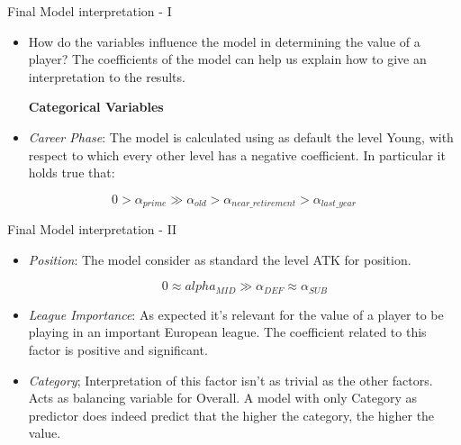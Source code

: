 \documentclass[aspectratio=169,xcolor=dvipsnames]{beamer}
\begin{document}

\begin{frame}{Final Model interpretation - I}
\begin{itemize}
\item How do the variables influence the model in determining the value of a player? The coefficients of the model can help us explain how to give an interpretation to the results.

\vspace{5mm}

\begin{large}
\begin{center}
\textbf{Categorical Variables}
\end{center}
\end{large}
\end{itemize}

\vspace{5mm}

\begin{itemize}
    \item \textit{Career Phase}: The model is calculated using as default the level Young, with respect to which every other level has a negative coefficient. In particular it holds true that:
\end{itemize}

\begin{equation*}
 0 >\alpha_{prime} \gg \alpha_{old} > \alpha_{near\_retirement} > \alpha_{last\_year}
\end{equation*}
\end{frame}

\begin{frame}{Final Model interpretation - II}
\begin{itemize}
    \item \textit{Position}: The model consider as standard the level ATK for position. 

\begin{equation*}
    0 \approx alpha_{MID} \gg \alpha_{DEF} \approx \alpha_{SUB}
\end{equation*}

    \item \textit{League Importance}: As expected it's relevant for the value of a player to be playing in an important European league. The coefficient related to this factor is positive and significant.
    
    \item \textit{Category}; Interpretation of this factor isn't as trivial as the other factors. Acts as balancing variable for Overall. A model with only Category as predictor does indeed predict that the higher the category, the higher the value.
\end{itemize}
\end{frame}
\end{document}
